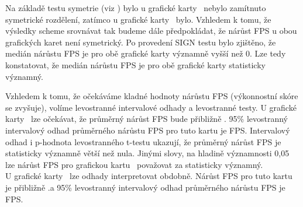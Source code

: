 \begin{enumerate}[label=\alph*)]
\begin{minipage}{0.94\textwidth}
        Na základě testu symetrie (viz ) bylo u grafické karty \nvidiaCardTri\ nebylo zamítnuto symetrické rozdělení, zatímco u grafické karty \amdCardSedm\ bylo.\@
        Vzhledem k tomu, že výsledky scheme srovnávat tak budeme dále předpokládat, že nárůst FPS u obou grafických karet není symetrický.
        Po provedení SIGN testu bylo zjištěno, že medián nárůstu FPS je pro obě grafické karty významně vyšší než 0.
        Lze tedy konstatovat, že medián nárůstu FPS je pro obě grafické karty statisticky významný.

        \label{tab:deterministic-normality-test}
        \vspace{0.5em}
        \renewcommand{\arraystretch}{1.3}
        \vspace{1em}

        Vzhledem k tomu, že očekáváme kladné hodnoty nárůstu FPS (výkonnostní skóre se zvyšuje), volíme levostranné intervalové odhady a levostranné testy.
        U grafické karty \nvidiaCardTri\ lze očekávat, že průměrný nárůst FPS bude přibližně .\@
        95\% levostranný intervalový odhad průměrného nárůstu FPS pro tuto kartu je \rtxInterval FPS.\@
        Intervalový odhad i p-hodnota levostranného t-testu ukazují, že průměrný nárůst FPS je statisticky významně větší než nula.
        Jinými slovy, na hladině významnosti 0,05 lze nárůst FPS pro grafickou kartu \nvidiaCardTri\ považovat za statisticky významný. \\

        U grafické karty \amdCardSedm\ lze odhady interpretovat obdobně.
        Nárůst FPS pro tuto kartu je přibližně .\@ a 95\% levostranný intervalový odhad průměrného nárůstu FPS je \amdInterval FPS.\@


\end{minipage}
\end{enumerate}
